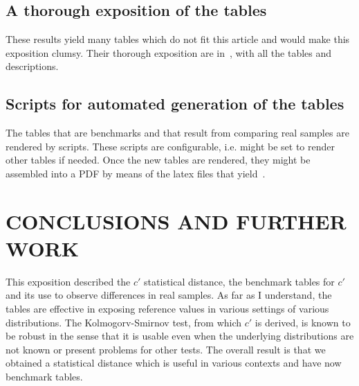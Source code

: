 \documentclass[12pt,fleqn]{article}
\begin{document}


\subsection{A thorough exposition of the tables}
These results yield many tables which do not fit this article and would make
this exposition clumsy.
Their thorough exposition are in~\cite{ksstats},
with all the tables and descriptions.

\subsection{Scripts for automated generation of the tables}
The tables that are benchmarks and that result from comparing real samples
are rendered by scripts.
These scripts are configurable, i.e. might be set to render other tables if needed.
Once the new tables are rendered, they might be assembled into a PDF by means
of the latex files that yield~\cite{ksstats}.

\section{CONCLUSIONS AND FURTHER WORK}\label{sec:conc}
This exposition described the $c'$ statistical distance,
the benchmark tables for $c'$ and its use to observe differences in real samples.
As far as I understand, the tables are effective in exposing reference
values in various settings of various distributions.
The Kolmogorv-Smirnov test, from which $c'$ is derived, is known
to be robust in the sense that it is usable even when the underlying distributions
are not known or present problems for other tests.
The overall result is that we obtained a statistical distance which is
useful in various contexts and have now benchmark tables.
\end{document}
